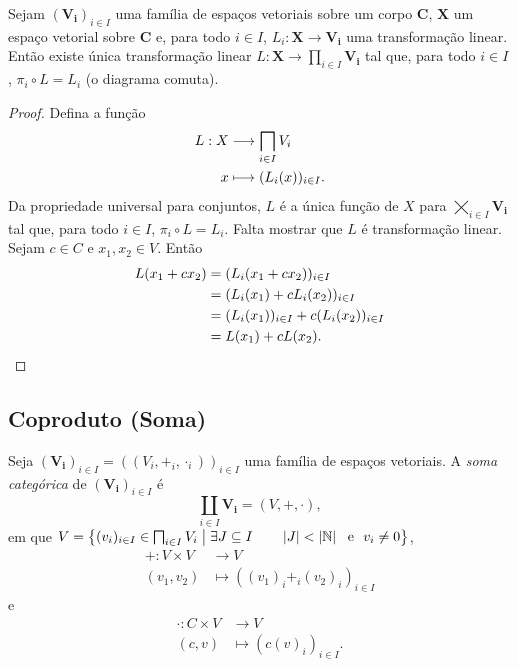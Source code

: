 \begin{prop}
Sejam $(\bm{V_i})_{i \in I}$ uma família de espaços vetoriais sobre um corpo $\bm C$, $\bm X$ um espaço vetorial sobre $\bm C$ e, para todo $i \in I$, $L_i: \bm X \to \bm{V_i}$ uma transformação linear. Então existe única transformação linear $L: \bm X \to \prod_{i \in I} \bm{V_i}$ tal que, para todo $i \in I$, $\pi_i \circ L = L_i$ (o diagrama comuta).
\begin{figure}
\centering
{}
\end{figure}
\end{prop}
\begin{proof}
Defina a função
	\begin{align*}
	\func{L}{X}{\prod_{i \in I} V_i}{x}{(L_i(x))_{i \in I}}.
	\end{align*}
Da propriedade universal para conjuntos, $L$ é a única função de $X$ para $\bigtimes_{i \in I} \bm{V_i}$ tal que, para todo $i \in I$, $\pi_i \circ L = L_i$. Falta mostrar que $L$ é transformação linear. Sejam $c \in C$ e $x_1,x_2 \in V$. Então
	\begin{align*}
	L(x_1+cx_2) &= (L_i(x_1+cx_2))_{i \in I} \\
		&= (L_i(x_1)+cL_i(x_2))_{i \in I} \\
		&= (L_i(x_1))_{i \in I}+c(L_i(x_2))_{i \in I} \\
		&= L(x_1)+cL(x_2). \qedhere
	\end{align*}
\end{proof}

\subsection{Coproduto (Soma)}

\begin{defi}
Seja $(\bm{V_i})_{i \in I} = ((V_i,+_i,\cdot_i))_{i \in I}$ uma família de espaços vetoriais. A \emph{soma categórica} de $(\bm{V_i})_{i \in I}$ é
	\begin{equation*}
	\coprod_{i \in I} \bm{V_i} = (V,+,\cdot),
	\end{equation*}
em que $V = \set{(v_i)_{i \in I} \in \prod_{i \in I} V_i}{\exists J \subseteq I \qquad \card{J} < \card{\N} \e v_i \neq 0}$,
	\begin{align*}
	+: V \times V &\to V \\
			(v_1,v_2) &\mapsto ((v_1)_i +_i (v_2)_i)_{i \in I}
	\end{align*}
e
	\begin{align*}
	\cdot: C \times V &\to V \\
			(c,v) &\mapsto (c(v)_i)_{i \in I}.
	\end{align*}
\end{defi}

